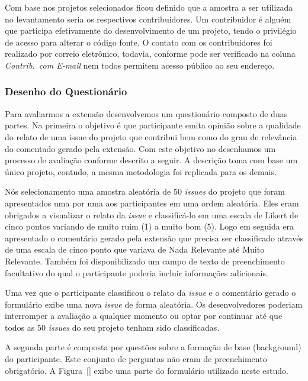 Com base nos projetos selecionados ficou definido que a amostra a ser utilizada
no levantamento seria os respectivos contribuidores. Um contribuidor é alguém
que participa efetivamente do desenvolvimento de um projeto, tendo o privilégio
de acesso para alterar o código fonte. O contato com os contribuidores foi
realizado por correio eletrônico, todavia, conforme pode ser verificado na
coluna \textit{Contrib.\ com E-mail} nem todos permitem acesso público ao seu
endereço.

\subsubsection{Desenho do Questionário}
\label{ssub:sug_melhoria_desenho_questionario}

Para avaliarmos a extensão desenvolvemos um questionário composto de duas
partes. Na primeira o objetivo é que participante emita opinião sobre a
qualidade do relato de uma issue do projeto que contribui bem como do grau de
relevância do comentado gerado pela extensão. Com este objetivo no desenhamos um
processo de avaliação conforme descrito a seguir. A descrição toma com base um
único projeto, contudo, a mesma metodologia foi replicada para os demais.

Nós selecionamento uma amostra aleatória de 50 \textit{issues} do projeto que
foram apresentados uma por uma aos participantes em uma ordem aleatória. Eles
eram obrigados a visualizar o relato da \textit{issue} e classificá-lo em uma
escala de Likert de cinco pontos variando de muito ruim (1) a muito bom (5).
Logo em seguida era apresentado o comentário gerado pela extensão que precisa
ser classificado através de uma escala de cinco ponto que variava de Nada
Relevante até Muito Relevante. Também foi disponibilizado um campo de texto de
preenchimento facultativo do qual o participante poderia incluir informações
adicionais.

Uma vez que o participante classificou o relato da \textit{issue} e o comentário
gerado o formulário exibe uma nova \textit{issue} de forma aleatória. Os
desenvolvedores poderiam interromper a avaliação a qualquer momento ou optar por
continuar até que todos as 50 \textit{issues} do seu projeto tenham sido
classificadas.

A segunda parte é composta por questões sobre a formação de base (background) do
participante. Este conjunto de perguntas não eram de preenchimento obrigatório.
A Figura~\ref{} exibe uma parte do formulário utilizado neste estudo.


